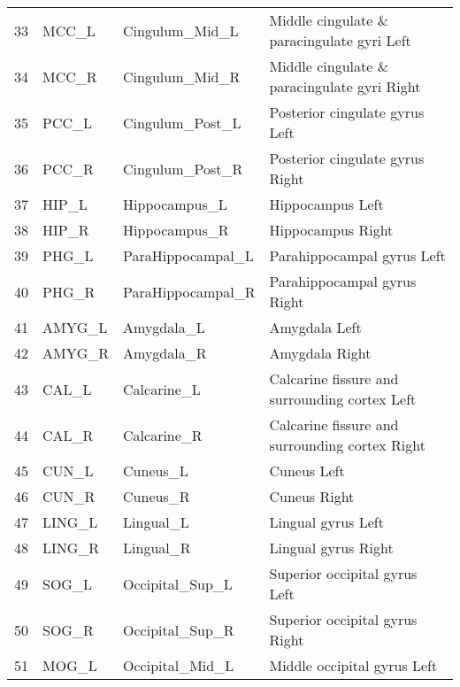 \documentclass[12pt,reqno]{amsart}
\theoremstyle{definition}
\begin{document}
\begin{longtable}{rlll}
 33 &       MCC\_L &       Cingulum\_Mid\_L &         Middle cingulate \& paracingulate gyri Left \\
 34 &       MCC\_R &       Cingulum\_Mid\_R &        Middle cingulate \& paracingulate gyri Right \\
 35 &       PCC\_L &      Cingulum\_Post\_L &                     Posterior cingulate gyrus Left \\
 36 &       PCC\_R &      Cingulum\_Post\_R &                    Posterior cingulate gyrus Right \\
 37 &       HIP\_L &        Hippocampus\_L &                                   Hippocampus Left \\
 38 &       HIP\_R &        Hippocampus\_R &                                  Hippocampus Right \\
 39 &       PHG\_L &    ParaHippocampal\_L &                         Parahippocampal gyrus Left \\
 40 &       PHG\_R &    ParaHippocampal\_R &                        Parahippocampal gyrus Right \\
 41 &      AMYG\_L &           Amygdala\_L &                                      Amygdala Left \\
 42 &      AMYG\_R &           Amygdala\_R &                                     Amygdala Right \\
 43 &       CAL\_L &          Calcarine\_L &      Calcarine fissure and surrounding cortex Left \\
 44 &       CAL\_R &          Calcarine\_R &     Calcarine fissure and surrounding cortex Right \\
 45 &       CUN\_L &             Cuneus\_L &                                        Cuneus Left \\
 46 &       CUN\_R &             Cuneus\_R &                                       Cuneus Right \\
 47 &      LING\_L &            Lingual\_L &                                 Lingual gyrus Left \\
 48 &      LING\_R &            Lingual\_R &                                Lingual gyrus Right \\
 49 &       SOG\_L &      Occipital\_Sup\_L &                      Superior occipital gyrus Left \\
 50 &       SOG\_R &      Occipital\_Sup\_R &                     Superior occipital gyrus Right \\
 51 &       MOG\_L &      Occipital\_Mid\_L &                        Middle occipital gyrus Left \\

\end{longtable}
\end{document}
